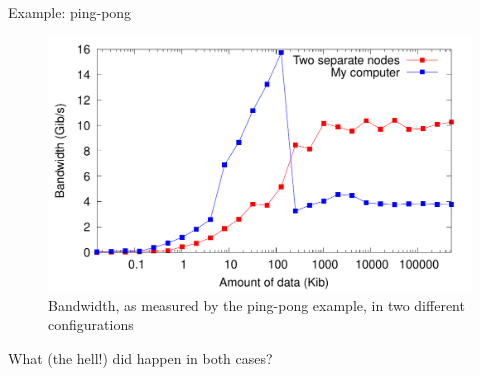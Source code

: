 \begin{frame}{Example: ping-pong}
	\begin{figure}
		\includegraphics[width=.85\textwidth]{im/result_MPI_ping}
		\caption{Bandwidth, as measured by the ping-pong example, in two different configurations}
	\end{figure}
What (the hell!) did happen in both cases?
\end{frame}

